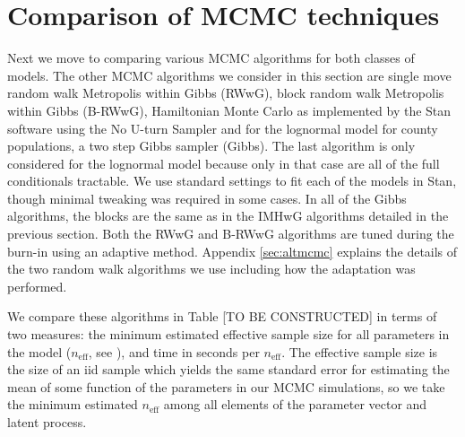 \documentclass[12pt]{article}
\begin{document}


\section{Comparison of MCMC techniques}\label{sec:compest}

Next we move to comparing various MCMC algorithms for both classes of models. The other MCMC algorithms we consider in this section are single move random walk Metropolis within Gibbs (RWwG), block random walk Metropolis within Gibbs (B-RWwG), Hamiltonian Monte Carlo as implemented by the Stan software \citep{carpenter2015stan} using the No U-turn Sampler \citep{homan2014no} and for the lognormal model for county populations, a two step Gibbs sampler (Gibbs). The last algorithm is only considered for the lognormal model because only in that case are all of the full conditionals tractable. We use standard settings to fit each of the models in Stan, though minimal tweaking was required in some cases. In all of the Gibbs algorithms, the blocks are the same as in the IMHwG algorithms detailed in the previous section. Both the RWwG and B-RWwG algorithms are tuned during the burn-in using an adaptive method. Appendix \ref{sec:altmcmc} explains the details of the two random walk algorithms we use including how the adaptation was performed. 

We compare these algorithms in Table [TO BE CONSTRUCTED] %
 in terms of two measures: the minimum estimated effective sample size for all parameters in the model ($n_{\text{eff}}$, see \citet[Section~12.3.5]{robert2013monte}), and time in seconds per $n_{\text{eff}}$. The effective sample size is the size of an iid sample which yields the same standard error for estimating the mean of some function of the parameters in our MCMC simulations, so we take the minimum estimated $n_{\text{eff}}$ among all elements of the parameter vector and latent process. 
\end{document}
